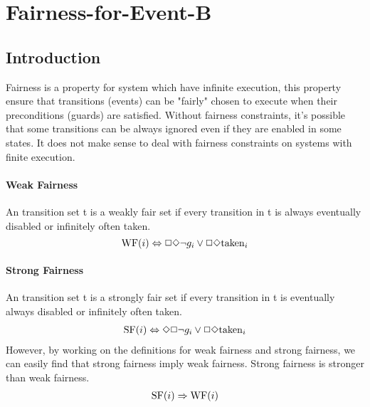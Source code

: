 
\section{Fairness-for-Event-B}
\label{sec:Fairness-for-Event-B}
\newcommand{\WF}{\mathrm{WF}}
\newcommand{\SF}{\mathrm{SF}}
\newcommand{\RESP}[2]{#1\rightsquigarrow{#2}}
\subsection{Introduction}
Fairness is a property for system which have infinite execution, this property ensure that transitions (events) can be "fairly" chosen to execute when their preconditions (guards) are satisfied. Without fairness constraints, it's possible that some transitions can be always ignored even if they are enabled in some states. It does not make sense to deal with fairness constraints on systems with finite execution.
\paragraph{Weak Fairness}
An transition set t is a weakly fair set if every transition in t is always eventually disabled or infinitely often taken.
\begin{displaymath}
  \WF(i)\Equiv\Always\Eventually\Not g_i\Or\Always\Eventually\mathrm{taken}_i
\end{displaymath}
\paragraph{Strong Fairness}
An transition set t is a strongly fair set if every transition in t is eventually always disabled or infinitely often taken.
\begin{gather*}
  \SF(i)\Equiv\Eventually\Always\Not g_i\Or\Always\Eventually{\mathrm{taken}}_i
\end{gather*}
However, by working on the definitions for weak fairness and strong fairness, we can easily find that strong fairness imply weak fairness. Strong fairness is stronger than weak fairness.  
\begin{gather*}
  \SF(i)\Implies \WF(i)
\end{gather*}

